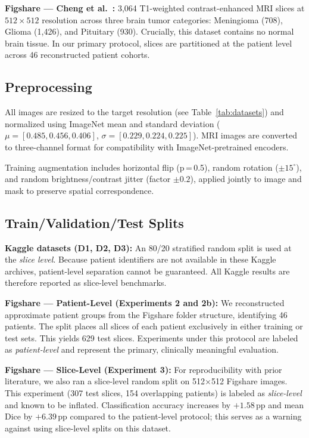 \documentclass[journal]{IEEEtran}
\begin{document}
\textbf{Figshare — Cheng et al.~\cite{dataset_figshare_cheng, cheng2015enhanced}:} 3{,}064 T1-weighted contrast-enhanced MRI slices at $512{\times}512$ resolution across three brain tumor categories: Meningioma (708), Glioma (1{,}426), and Pituitary (930). Crucially, this dataset contains no normal brain tissue. In our primary protocol, slices are partitioned at the patient level across 46 reconstructed patient cohorts.

\subsection{Preprocessing}
All images are resized to the target resolution (see Table~\ref{tab:datasets})
and normalized using ImageNet mean and standard deviation
($\mu = [0.485, 0.456, 0.406]$, $\sigma = [0.229, 0.224, 0.225]$).
MRI images are converted to three-channel format for compatibility with
ImageNet-pretrained encoders.

Training augmentation includes horizontal flip (p\,=\,0.5), random rotation
($\pm15^\circ$), and random brightness/contrast jitter (factor $\pm0.2$),
applied jointly to image and mask to preserve spatial correspondence.

\subsection{Train/Validation/Test Splits}

\textbf{Kaggle datasets (D1, D2, D3):} An 80/20 stratified random split is
used at the \emph{slice level}. Because patient identifiers are not available
in these Kaggle archives, patient-level separation cannot be guaranteed.
All Kaggle results are therefore reported as slice-level benchmarks.

\textbf{Figshare — Patient-Level (Experiments 2 and 2b):} We reconstructed
approximate patient groups from the Figshare folder structure, identifying
46 patients. The split places all slices of each patient exclusively in
either training or test sets. This yields 629 test slices. Experiments under
this protocol are labeled as \emph{patient-level} and represent the primary,
clinically meaningful evaluation.

\textbf{Figshare — Slice-Level (Experiment 3):} For reproducibility with
prior literature, we also ran a slice-level random split on 512$\times$512
Figshare images. This experiment (307 test slices, 154 overlapping patients)
is labeled as \emph{slice-level} and known to be inflated. Classification
accuracy increases by $+1.58\,\text{pp}$ and mean Dice by $+6.39\,\text{pp}$
compared to the patient-level protocol; this serves as a warning against
using slice-level splits on this dataset.
\end{document}
